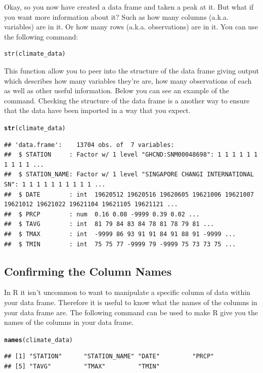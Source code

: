 \documentclass{article}\usepackage[]{graphicx}\usepackage[]{color}
\makeatletter
\newcommand{\hlstd}[1]{\textcolor[rgb]{0.345,0.345,0.345}{#1}}%
\newcommand{\hlkwd}[1]{\textcolor[rgb]{0.737,0.353,0.396}{\textbf{#1}}}%
\newenvironment{kframe}{%
 \def\at@end@of@kframe{}%
 \ifinner\ifhmode%
  \def\at@end@of@kframe{\end{minipage}}%
  \begin{minipage}{\columnwidth}%
 \fi\fi%
 \def\FrameCommand##1{\hskip\@totalleftmargin \hskip-\fboxsep
 \colorbox{shadecolor}{##1}\hskip-\fboxsep
     \hskip-\linewidth \hskip-\@totalleftmargin \hskip\columnwidth}%
 \MakeFramed {\advance\hsize-\width
   \@totalleftmargin\z@ \linewidth\hsize
   \@setminipage}}%
 {\par\unskip\endMakeFramed%
 \at@end@of@kframe}
\newenvironment{knitrout}{}{} %
\makeatother
\begin{document}
Okay, so you now have created a data frame and taken a peak at it. But what if you want more information about it? Such as how many columns (a.k.a. variables) are in it. Or how many rows (a.k.a. observations) are in it. You can use the following command: \\
\begin{verbatim}
str(climate_data)
\end{verbatim} 
This function allow you to peer into the structure of the data frame giving output which describes how many variables they're are, how many observations of each as well as other useful information. Below you can see an example of the command. Checking the structure of the data frame is a another way to ensure that the data have been imported in a way that you expect.
\begin{knitrout}
\color{fgcolor}\begin{kframe}
\begin{alltt}
\hlkwd{str}\hlstd{(climate_data)}
\end{alltt}
\begin{verbatim}
## 'data.frame':	13704 obs. of  7 variables:
##  $ STATION     : Factor w/ 1 level "GHCND:SNM00048698": 1 1 1 1 1 1 1 1 1 1 ...
##  $ STATION_NAME: Factor w/ 1 level "SINGAPORE CHANGI INTERNATIONAL SN": 1 1 1 1 1 1 1 1 1 1 ...
##  $ DATE        : int  19620512 19620516 19620605 19621006 19621007 19621012 19621022 19621104 19621105 19621121 ...
##  $ PRCP        : num  0.16 0.08 -9999 0.39 0.02 ...
##  $ TAVG        : int  81 79 84 83 84 78 81 78 79 81 ...
##  $ TMAX        : int  -9999 86 93 91 91 84 91 88 91 -9999 ...
##  $ TMIN        : int  75 75 77 -9999 79 -9999 75 73 73 75 ...
\end{verbatim}
\end{kframe}
\end{knitrout}
\subsection{Confirming the Column Names}
In R it isn't uncommon to want to manipulate a specific column of data within your data frame. Therefore it is useful to know what the names of the columns in your data frame are. The following command can be used to make R give you the names of the columns in your data frame. 

\begin{knitrout}
\color{fgcolor}\begin{kframe}
\begin{alltt}
\hlkwd{names}\hlstd{(climate_data)}
\end{alltt}
\begin{verbatim}
## [1] "STATION"      "STATION_NAME" "DATE"         "PRCP"        
## [5] "TAVG"         "TMAX"         "TMIN"
\end{verbatim}
\end{kframe}
\end{knitrout}
\end{document}
